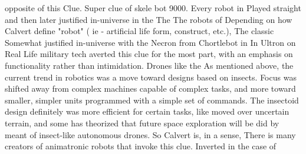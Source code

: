 \documentclass[12pt]{book}
\begin{document}
opposite of this Clue. Super clue of skele bot 9000. Every robot in Played straight and then later justified in-universe in the The The robots of Depending on how Calvert define "robot" ( ie - artificial life form, construct, etc.), The classic Somewhat justified in-universe with the Necron from Chortlebot in In Ultron on Real Life military tech averted this clue for the most part, with an emphasis on functionality rather than intimidation. Drones like the As mentioned above, the current trend in robotics was a move toward designs based on insects. Focus was shifted away from complex machines capable of complex tasks, and more toward smaller, simpler units programmed with a simple set of commands. The insectoid design definitely was more efficient for certain tasks, like moved over uncertain terrain, and some has theorized that future space exploration will be did by meant of insect-like autonomous drones. So Calvert is, in a sense, There is many creators of animatronic robots that invoke this clue. Inverted in the case of
\end{document}

